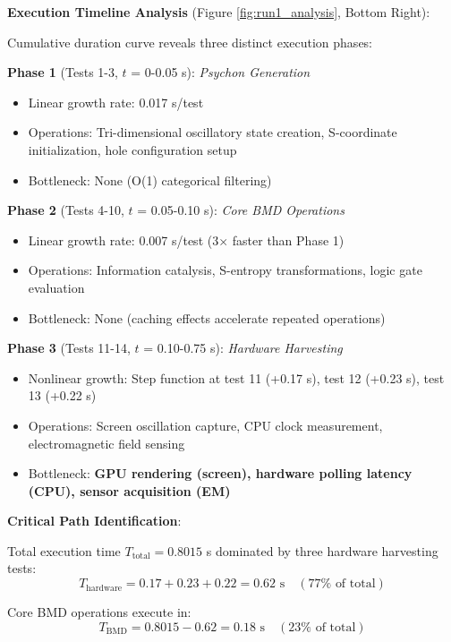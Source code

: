 \documentclass[11pt,a4paper]{article}
\begin{document}
\textbf{Execution Timeline Analysis} (Figure \ref{fig:run1_analysis}, Bottom Right):

Cumulative duration curve reveals three distinct execution phases:

\textbf{Phase 1} (Tests 1-3, $t$ = 0-0.05 s): \textit{Psychon Generation}
\begin{itemize}
\item Linear growth rate: 0.017 s/test
\item Operations: Tri-dimensional oscillatory state creation, S-coordinate initialization, hole configuration setup
\item Bottleneck: None (O(1) categorical filtering)
\end{itemize}

\textbf{Phase 2} (Tests 4-10, $t$ = 0.05-0.10 s): \textit{Core BMD Operations}
\begin{itemize}
\item Linear growth rate: 0.007 s/test (3$\times$ faster than Phase 1)
\item Operations: Information catalysis, S-entropy transformations, logic gate evaluation
\item Bottleneck: None (caching effects accelerate repeated operations)
\end{itemize}

\textbf{Phase 3} (Tests 11-14, $t$ = 0.10-0.75 s): \textit{Hardware Harvesting}
\begin{itemize}
\item Nonlinear growth: Step function at test 11 (+0.17 s), test 12 (+0.23 s), test 13 (+0.22 s)
\item Operations: Screen oscillation capture, CPU clock measurement, electromagnetic field sensing
\item Bottleneck: \textbf{GPU rendering (screen), hardware polling latency (CPU), sensor acquisition (EM)}
\end{itemize}

\textbf{Critical Path Identification}:

Total execution time $T_{\text{total}} = 0.8015$ s dominated by three hardware harvesting tests:
\begin{equation}
T_{\text{hardware}} = 0.17 + 0.23 + 0.22 = 0.62 \text{ s} \quad (77\% \text{ of total})
\end{equation}

Core BMD operations execute in:
\begin{equation}
T_{\text{BMD}} = 0.8015 - 0.62 = 0.18 \text{ s} \quad (23\% \text{ of total})
\end{equation}
\end{document}
